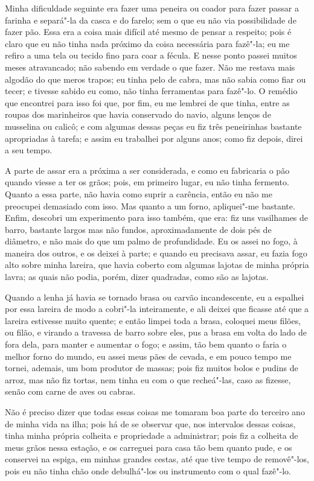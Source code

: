 Minha dificuldade seguinte era fazer uma peneira ou coador para fazer
passar a farinha e separá"-la da casca e do farelo; sem o que eu não via
possibilidade de fazer pão. Essa era a coisa mais difícil até mesmo de
pensar a respeito; pois é claro que eu não tinha nada próximo da coisa
necessária para fazê"-la; eu me refiro a uma tela ou tecido fino para
coar a fécula. E nesse ponto passei muitos meses atravancado; não
sabendo em verdade o que fazer. Não me restava mais algodão do que meros
trapos; eu tinha pelo de cabra, mas não sabia como fiar ou tecer; e
tivesse sabido eu como, não tinha ferramentas para fazê"-lo. O remédio
que encontrei para isso foi que, por fim, eu me lembrei de que tinha,
entre as roupas dos marinheiros que havia conservado do navio, alguns
lenços de musselina ou calicô; e com algumas dessas peças eu fiz três
peneirinhas bastante apropriadas à tarefa; e assim eu trabalhei por
alguns anos; como fiz depois, direi a seu tempo.

A parte de assar era a próxima a ser considerada, e como eu fabricaria o
pão quando viesse a ter os grãos; pois, em primeiro lugar, eu não tinha
fermento. Quanto a essa parte, não havia como suprir a carência, então
eu não me preocupei demasiado com isso. Mas quanto a um forno,
apliquei"-me bastante. Enfim, descobri um experimento para isso também,
que era: fiz uns vasilhames de barro, bastante largos mas não fundos,
aproximadamente de dois pés de diâmetro, e não mais do que um palmo de
profundidade. Eu os assei no fogo, à maneira dos outros, e os deixei à
parte; e quando eu precisava assar, eu fazia fogo alto sobre minha
lareira, que havia coberto com algumas lajotas de minha própria lavra;
as quais não podia, porém, dizer quadradas, como são as lajotas.

Quando a lenha já havia se tornado brasa ou carvão incandescente, eu a
espalhei por essa lareira de modo a cobri"-la inteiramente, e ali deixei
que ficasse até que a lareira estivesse muito quente; e então limpei
toda a brasa, coloquei meus filões, ou filão, e virando a travessa de
barro sobre eles, pus a brasa em volta do lado de fora dela, para manter
e aumentar o fogo; e assim, tão bem quanto o faria o melhor forno do
mundo, eu assei meus pães de cevada, e em pouco tempo me tornei,
ademais, um bom produtor de massas; pois fiz muitos bolos e pudins de
arroz, mas não fiz tortas, nem tinha eu com o que recheá"-las, caso as
fizesse, senão com carne de aves ou cabras.

Não é preciso dizer que todas essas coisas me tomaram boa parte do
terceiro ano de minha vida na ilha; pois há de se observar que, nos
intervalos dessas coisas, tinha minha própria colheita e propriedade a
administrar; pois fiz a colheita de meus grãos nessa estação, e os
carreguei para casa tão bem quanto pude, e os conservei na espiga, em
minhas grandes cestas, até que tive tempo de removê"-los, pois eu não
tinha chão onde debulhá"-los ou instrumento com o qual fazê"-lo.

